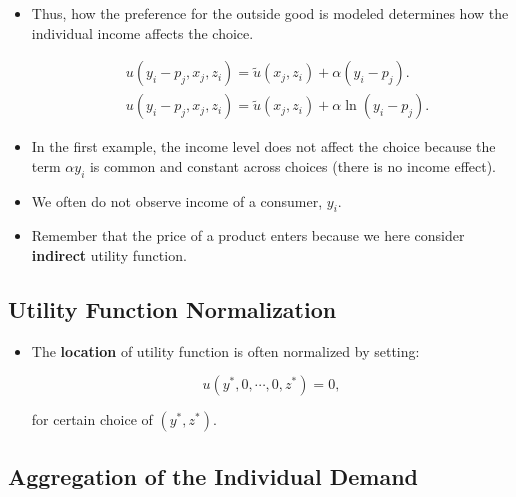 \documentclass[]{book}
\providecommand{\tightlist}{%
  \setlength{\itemsep}{0pt}\setlength{\parskip}{0pt}}
\begin{document}
\begin{itemize}
\tightlist
\item
  Thus, how the preference for the outside good is modeled determines
  how the individual income affects the choice.

  \begin{equation}
  \begin{split}
  &u(y_i - p_j, x_j, z_i) = \tilde{u}(x_j, z_i) + \alpha(y_i - p_j).\\
  &u(y_i - p_j, x_j, z_i) = \tilde{u}(x_j, z_i) + \alpha \ln (y_i - p_j).
  \end{split}
  \end{equation}
\item
  In the first example, the income level does not affect the choice
  because the term \(\alpha y_i\) is common and constant across choices
  (there is no income effect).
\item
  We often do not observe income of a consumer, \(y_i\).
\item
  Remember that the price of a product enters because we here consider
  \textbf{indirect} utility function.
\end{itemize}

\subsection{Utility Function
Normalization}\label{utility-function-normalization}

\begin{itemize}
\tightlist
\item
  The \textbf{location} of utility function is often normalized by
  setting:

  \begin{equation}
  u(y^*, 0, \cdots, 0, z^*) = 0,
  \end{equation}

  for certain choice of \((y^*, z^*)\).
\end{itemize}

\subsection{Aggregation of the Individual
Demand}\label{aggregation-of-the-individual-demand}
\end{document}
